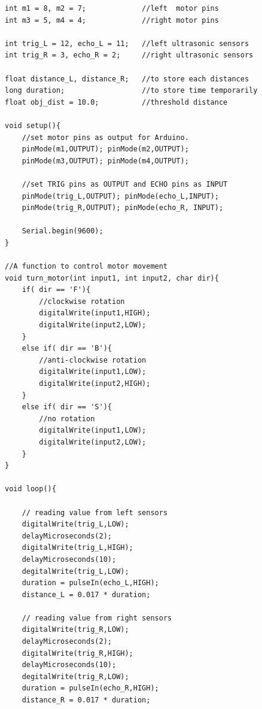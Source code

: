 \pagebreak
\begin{lstlisting}[style=CStyle]
int m1 = 8, m2 = 7;             //left  motor pins
int m3 = 5, m4 = 4;             //right motor pins

int trig_L = 12, echo_L = 11;   //left ultrasonic sensors
int trig_R = 3, echo_R = 2;     //right ultrasonic sensors

float distance_L, distance_R;   //to store each distances
long duration;                  //to store time temporarily
float obj_dist = 10.0;          //threshold distance

void setup(){
    //set motor pins as output for Arduino.
    pinMode(m1,OUTPUT); pinMode(m2,OUTPUT);
    pinMode(m3,OUTPUT); pinMode(m4,OUTPUT);
    
    //set TRIG pins as OUTPUT and ECHO pins as INPUT
    pinMode(trig_L,OUTPUT); pinMode(echo_L,INPUT);
    pinMode(trig_R,OUTPUT); pinMode(echo_R, INPUT);
    
    Serial.begin(9600);
}

//A function to control motor movement
void turn_motor(int input1, int input2, char dir){
    if( dir == 'F'){
        //clockwise rotation
        digitalWrite(input1,HIGH);
        digitalWrite(input2,LOW);
    }
    else if( dir == 'B'){
        //anti-clockwise rotation
        digitalWrite(input1,LOW);
        digitalWrite(input2,HIGH);
    }
    else if( dir == 'S'){
        //no rotation
        digitalWrite(input1,LOW);
        digitalWrite(input2,LOW);
    }
}

void loop(){
    
    // reading value from left sensors
    digitalWrite(trig_L,LOW);
    delayMicroseconds(2);
    digitalWrite(trig_L,HIGH);
    delayMicroseconds(10);
    degitalWrite(trig_L,LOW);
    duration = pulseIn(echo_L,HIGH);
    distance_L = 0.017 * duration;
    
    // reading value from right sensors
    digitalWrite(trig_R,LOW);
    delayMicroseconds(2);
    digitalWrite(trig_R,HIGH);
    delayMicroseconds(10);
    degitalWrite(trig_R,LOW);
    duration = pulseIn(echo_R,HIGH);
    distance_R = 0.017 * duration;
    

\end{lstlisting}
